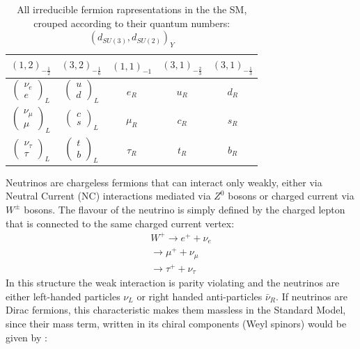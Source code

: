 \documentclass[12pt,a4paper,openright,twoside]{report}
\begin{document}
\begin{table}[t]
	\centering
	\setlength{\tabcolsep}{8pt}
	\renewcommand{\arraystretch}{1.3}
	\begin{tabular}{ c c | c c c}
		\hline\hline
		$(1,2)_{-\frac{1}{2}}$ &$(3,2)_{-\frac{1}{6}}$ &$(1,1)_{-1}$ &$(3,1)_{-\frac{2}{3}}$ &$(3,1)_{-\frac{1}{3}}$\\ 
		\hline
		$\begin{pmatrix} \nu_e \\ e \end{pmatrix}_L$ & $\begin{pmatrix} u \\ d \end{pmatrix}_L$ & $e_R$ & $u_R$ & $d_R$\\
		$\begin{pmatrix} \nu_\mu \\ \mu \end{pmatrix}_L$ & $\begin{pmatrix} c \\ s \end{pmatrix}_L$ & $\mu_R$ & $c_R$ & $s_R$\\
	$\begin{pmatrix} \nu_\tau \\ \tau \end{pmatrix}_L$ & $\begin{pmatrix} t \\ b \end{pmatrix}_L$ & $\tau_R$ & $t_R$ & $b_R$\\
		\hline\hline
	\end{tabular}
    \caption{All irreducible fermion rapresentations in the the SM, crouped according to their quantum numbers: $(d_{SU(3)}, d_{SU(2)})_Y$}
\end{table}%
Neutrinos are chargeless fermions that can interact only weakly, either via Neutral Current (NC) interactions mediated via $Z^0$ bosons or charged current via $W^\pm$ bosons. The flavour of the neutrino is simply defined by the charged lepton that is connected to the same charged current vertex:
\begin{equation}
\begin{split}
W^+\rightarrow e^+ + \nu_e\\
   \rightarrow \mu^+ + \nu_\mu\\
   \rightarrow \tau^+ + \nu_\tau
\end{split}
\end{equation}  
In this structure the weak interaction is parity violating and the neutrinos are either left-handed particles $\nu_L$ or right handed anti-particles $\bar \nu_R$. If neutrinos are Dirac fermions, this characteristic makes them massless in the Standard Model, since their mass term, written in its chiral components (Weyl spinors) would be given by :
\end{document}
